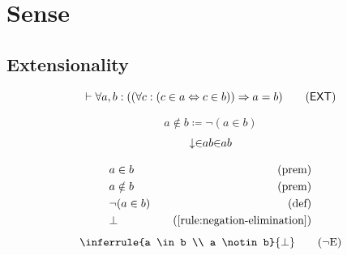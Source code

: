 \section{Sense}
\label{sec:axioms}

\subsection{Extensionality}

\begin{foundation}
    \begin{equation}
        \vdash \forall a, b: ((\forall c: (c \in a \lequiv c \in b)) \implies a = b)
        \tag{$\mathsf{EXT}$}
        \label{axiom:extensionality}
    \end{equation}
\end{foundation}

\begin{notation}
    \[a \notin b \coloneqq \neg(a \in b)\]
    \[{\downarrow}{\in}ab{\in}ab\]
\end{notation}

\begin{align*}
    & \hspace{0em} a \in b & \quad (\text{prem})\\
    & \hspace{0em} a \notin b & \quad (\text{prem})\\
    & \hspace{0em} \neg (a \in b) & \quad (\text{def})\\
    & \hspace{0em} \bot & \quad (\text{\ref{rule:negation-elimination}})
\end{align*}
\begin{equation}
    \inferrule{a \in b \\ a \notin b}{\bot}
    \tag{{$\neg$}E}
    \label{rule:notin-elimination}
\end{equation}

